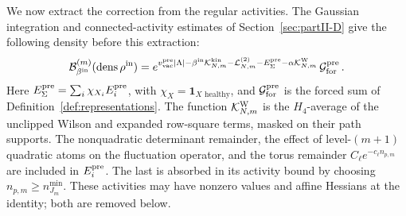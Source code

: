 We now extract the correction from the regular activities. The Gaussian integration and connected-activity estimates of Section~\ref{sec:partII-D} give the following density before this extraction:
\begin{equation}\label{eq:C-pre-reset-density}
 \mathcal{B}^{(m)}_{\beta^{\rm in}}(\operatorname{dens}\rho^{\rm in})
 =e^{v_{\rm vac}^{\rm pre}|\Lambda|-\beta^{\rm in}\mathcal K^{\rm kin}_{N,m}-\mathcal L^{(2)}_{N,m}-E_\Sigma^{\rm pre}-\alpha\mathcal K^{\rm W}_{N,m}}\,\mathcal G_{\rm for}^{\rm pre}\,.
\end{equation}
Here $E_\Sigma^{\rm pre}=\sum_i\chi_{X_i}E_i^{\rm pre}$, with $\chi_X=\mathbf1_{X\text{ healthy}}$, and $\mathcal G_{\rm for}^{\rm pre}$ is the forced sum of Definition~\ref{def:representations}. The function $\mathcal K^{\rm W}_{N,m}$ is the $H_4$-average of the unclipped Wilson and expanded row-square terms, masked on their path supports. The nonquadratic determinant remainder, the effect of level-$(m+1)$ quadratic atoms on the fluctuation operator, and the torus remainder $C_\ell e^{-c_\ell n_{p,m}}$ are included in $E_i^{\rm pre}$. The last is absorbed in its activity bound by choosing $n_{p,m}\ge n^{\min}_{J_m}$. These activities may have nonzero values and affine Hessians at the identity; both are removed below.

